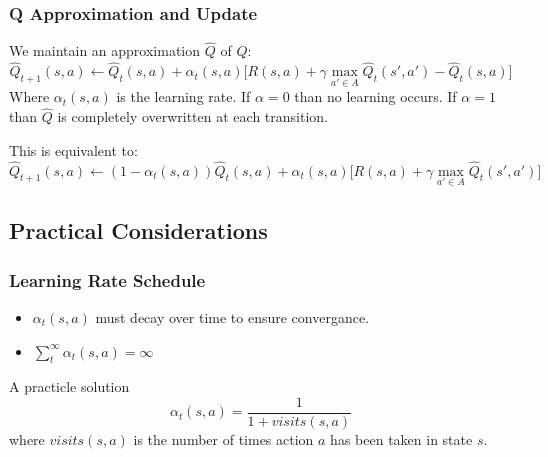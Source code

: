 \documentclass[ignorenonframetext]{beamer}
\begin{document}
\begin{frame}[allowframebreaks]
	\frametitle{Q Approximation and Update}
	We maintain an approximation $\hat{Q}$ of $Q$:
	\[
	\hat{Q}_{t+1}(s,a) \leftarrow \hat{Q}_t(s,a) + \alpha_t(s,a)\big[ R(s,a) + \gamma \max_{a' \in A}
	\hat{Q}_t(s',a') - \hat{Q}_t(s,a) \big]
	\]
	Where $\alpha_t(s,a)$ is the learning rate.  
	If $\alpha = 0$ than no learning occurs.  If $\alpha = 1$ than
	$\hat{Q}$ is completely overwritten at each transition.

	\pause
	This is equivalent to:
	\[
	\hat{Q}_{t+1}(s,a) \leftarrow (1-\alpha_t(s,a))\hat{Q}_{t}(s,a) + \alpha_t(s,a)\big[ R(s,a) + \gamma \max_{a' \in A}
	\hat{Q}_t(s',a') \big]
	\]

\end{frame}

\subsection{Practical Considerations}

\begin{frame}
	\frametitle{Learning Rate Schedule}
	\begin{itemize}
		\item $\alpha_t(s,a)$ must decay over time to ensure convergance.
		\item $\sum_t^{\infty} \alpha_t(s,a) = \infty$ 
	\end{itemize}
	\begin{block}{A practicle solution}
		\[
		\alpha_t(s,a) = \frac{1}{1 + visits(s,a)}
		\]
		where $visits(s,a)$ is the number of times action $a$ has been
		taken in state $s$.
	\end{block}
\end{frame}
\end{document}
